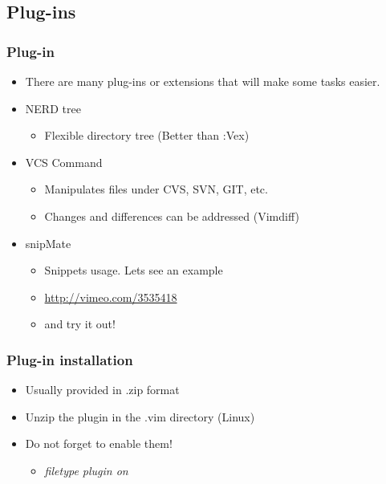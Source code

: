 \documentclass{beamer}
\begin{document}

\subsection{Plug-ins}
\begin{frame}
\frametitle{Plug-in}

\begin{itemize}
\item There are many plug-ins or extensions that will make some tasks easier.
\item NERD tree
  \begin{itemize}
  \item Flexible directory tree (Better than :Vex)
  \end{itemize}
\item VCS Command
  \begin{itemize}
  \item Manipulates files under CVS, SVN, GIT, etc.
  \item Changes and differences can be addressed (Vimdiff)
  \end{itemize}
\item snipMate 
  \begin{itemize}
  \item Snippets usage. Lets see an example
  \item \url{http://vimeo.com/3535418}
  \item and try it out!
  \end{itemize}
\end{itemize}

\end{frame}




\begin{frame}
\frametitle{Plug-in installation}

\begin{itemize}
\item Usually provided in .zip format
\item Unzip the plugin in the .vim directory (Linux)
\item Do not forget to enable them! 
\begin{itemize}
\item \textit{filetype plugin on}
\end{itemize}
\end{itemize}

\end{frame}
\end{document}
